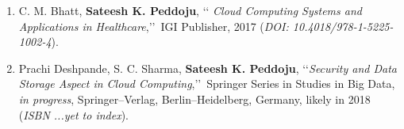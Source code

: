 \begin{enumerate}[label=(B\arabic*).]
	
	\item%
	C. M. Bhatt, \textbf{Sateesh K. Peddoju}, \lq\lq
	\emph{Cloud Computing Systems and Applications in Healthcare},\rq\rq\, IGI Publisher, 2017
	(\emph{DOI: 10.4018/978-1-5225-1002-4}).
	
	\item%
	Prachi Deshpande, S. C. Sharma, \textbf{Sateesh K. Peddoju},
	\lq\lq \emph{Security and Data Storage Aspect in Cloud Computing},\rq\rq\, Springer Series in
	Studies in Big Data, \textit{in progress}, Springer--Verlag, Berlin--Heidelberg,
	Germany, likely in 2018 (\emph{ISBN ...yet to index}).

\end{enumerate}
